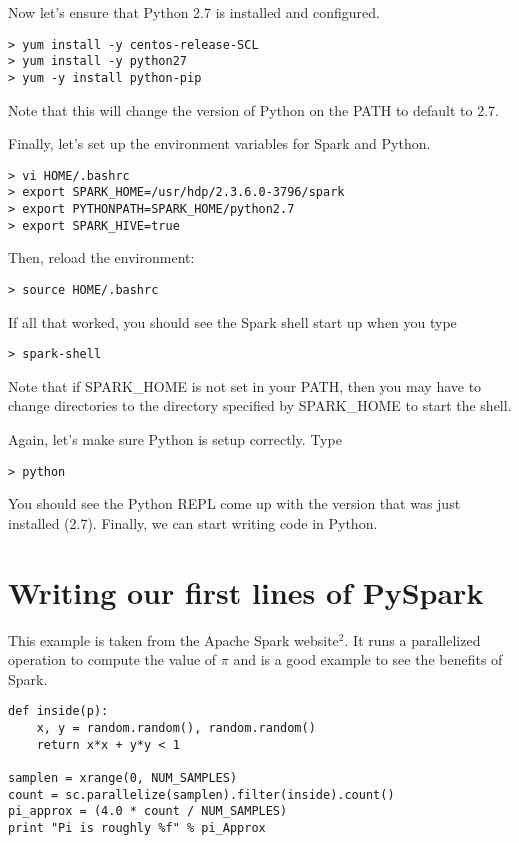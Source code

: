 \documentclass[9pt,twocolumn,twoside]{idsi}
\begin{document}
Now let's ensure that Python 2.7 is installed and configured.
\begin{verbatim}
> yum install -y centos-release-SCL
> yum install -y python27
> yum -y install python-pip
\end{verbatim}
Note that this will change the version of Python on the PATH to default to 2.7.

\noindent
Finally, let's set up the environment variables for Spark and Python.
\begin{verbatim}
> vi HOME/.bashrc
> export SPARK_HOME=/usr/hdp/2.3.6.0-3796/spark
> export PYTHONPATH=SPARK_HOME/python2.7
> export SPARK_HIVE=true
\end{verbatim}

\noindent
Then, reload the environment:
\begin{verbatim}
> source HOME/.bashrc
\end{verbatim}

If all that worked, you should see the Spark shell start up when you type
\begin{verbatim}
> spark-shell
\end{verbatim}

Note that if SPARK\_HOME is not set in your PATH, then you may have to change directories to the directory specified by SPARK\_HOME to start the shell.

Again, let's make sure Python is setup correctly. Type
\begin{verbatim}
> python
\end{verbatim}
You should see the Python REPL come up with the version that was just installed (2.7). Finally, we can start writing code in Python.

\section{Writing our first lines of PySpark}

This example is taken from the Apache Spark website$^2$. It runs a parallelized operation to compute the value of $\pi$ and is a good example to see the benefits of Spark.

\begin{lstlisting}
def inside(p):
    x, y = random.random(), random.random()
    return x*x + y*y < 1

samplen = xrange(0, NUM_SAMPLES)
count = sc.parallelize(samplen).filter(inside).count()
pi_approx = (4.0 * count / NUM_SAMPLES)
print "Pi is roughly %f" % pi_Approx
\end{lstlisting}
\end{document}
